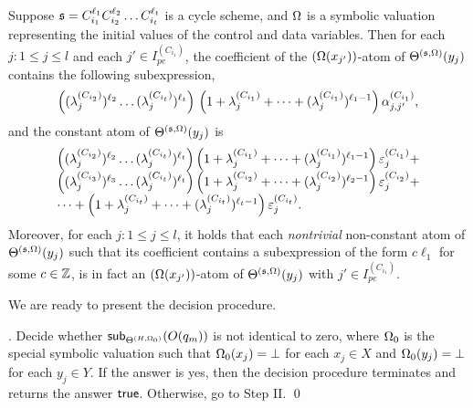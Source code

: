 \begin{proposition}\label{prop-cycle-schm}
Suppose $\schm=C_{i_1}^{\ell_1} C_{i_2}^{\ell_2} \dots C_{i_t}^{\ell_t}$ is a cycle scheme, and $\initval$ is a symbolic valuation representing the initial values of the control and data variables. Then for each $j: 1 \le j \le l$ and each $j' \in I^{(C_{i_1})}_{pe}$, the coefficient of the $(\initval(x_{j'}))$-atom of $\sumf^{(\schm,\initval)}(y_j)$ contains the following subexpression,
\[\left((\lambda^{(C_{i_2})}_{j})^{\ell_2} \dots (\lambda^{(C_{i_t})}_{j})^{\ell_t}\right) \\
\left(1+\lambda^{(C_{i_1})}_{j} + \dots + (\lambda^{(C_{i_1})}_{j})^{\ell_1-1} \right) \csta^{(C_{i_1})}_{j,j'},\]
and the constant atom of $\sumf^{(\schm,\initval)}(y_j)$ is
\[
\begin{array}{l c l}
\left((\lambda^{(C_{i_2})}_{j})^{\ell_2} \dots (\lambda^{(C_{i_t})}_{j})^{\ell_t}\right)
\left(1+\lambda^{(C_{i_1})}_{j} + \dots + (\lambda^{(C_{i_1})}_{j})^{\ell_1-1} \right) \cste^{(C_{i_1})}_{j} + \\
\left((\lambda^{(C_{i_3})}_{j})^{\ell_3} \dots (\lambda^{(C_{i_t})}_{j})^{\ell_t}\right)
\left(1+\lambda^{(C_{i_2})}_{j} + \dots + (\lambda^{(C_{i_2})}_{j})^{\ell_2-1} \right) \cste^{(C_{i_2})}_{j} +\\
 \dots + 
\left(1+\lambda^{(C_{i_t})}_{j} + \dots + (\lambda^{(C_{i_t})}_{j})^{\ell_t-1} \right) \cste^{(C_{i_t})}_{j}.
\end{array}
\]
Moreover, for each $j: 1 \le j \le l$, it holds that each \emph{nontrivial} non-constant atom of $\sumf^{(\schm,\initval)}(y_j)$ such that its coefficient contains a subexpression  of the form $c\ell_1$ for some $c \in \intnum$, is in fact an $(\initval(x_{j'}))$-atom of $\sumf^{(\schm,\initval)}(y_j)$ with $j' \in I^{(C_{i_1})}_{pe}$.
\end{proposition}

We are ready to present the decision procedure.

\smallskip

. Decide whether $\sub{O(q_m)}{\sumf^{(H,\initval_0)}}$ is not identical to zero, where $\initval_0$ is the special symbolic valuation such that $\initval_0(x_j)=\bot$ for each $x_j \in X$ and $\initval_0(y_j)=\bot$ for each $y_j \in Y$. If the answer is yes, then the decision procedure terminates and returns the answer $\ltrue$. Otherwise, go to Step II. \qed

\medskip


